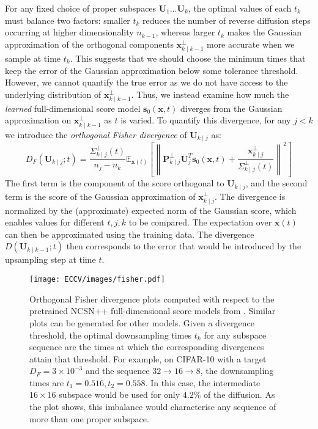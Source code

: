 \documentclass{article}
\begin{document}
For any fixed choice of proper subspaces $\mathbf{U}_1\ldots\mathbf{U}_k$, the optimal values of each $t_k$ must balance two factors: smaller $t_k$ reduces the number of reverse diffusion steps occurring at higher dimensionality $n_{k-1}$, whereas larger $t_k$ makes the Gaussian approximation of the orthogonal components $\mathbf{x}^{\perp}_{k\mid k-1}$ more accurate when we sample at time $t_k$. This suggests that we should choose the minimum times that keep the error of the Gaussian approximation below some tolerance threshold. However, we cannot quantify the true error as we do not have access to the underlying distribution of $\mathbf{x}^\perp_{k\mid k-1}$. Thus, we instead examine how much the \emph{learned} full-dimensional score model $\mathbf{s}_{0}(\mathbf{x}, t)$ diverges from the Gaussian approximation on $\mathbf{x}^\perp_{k\mid k-1}$ as $t$ is varied. To quantify this divergence, for any $j < k$ we introduce the \emph{orthogonal Fisher divergence} of $\mathbf{U}_{k\mid j}$ as:
\begin{equation}\label{eq:fisher}
    D_F(\mathbf{U}_{k\mid j}; t) = \frac{\Sigma^\perp_{k\mid j}(t)}{n_{j} - n_{k}}\mathbb{E}_{\mathbf{x}(t)}\left[\left\lVert \mathbf{P}^\perp_{k\mid j}\mathbf{U}_{j}^T\mathbf{s}_{0}(\mathbf{x}, t) + \frac{\mathbf{x}_{k\mid j}^\perp}{\Sigma^\perp_{k\mid j}(t)} \right\rVert^2 \right]
\end{equation}
The first term is the component of the score orthogonal to $\mathbf{U}_{k\mid j}$, and the second term is the score of the Gaussian approximation of $\mathbf{x}^\perp_{k\mid j}$. The divergence is normalized by the (approximate) expected norm of the Gaussian score, which enables values for different $t, j, k$ to be compared. The expectation over $\mathbf{x}(t)$ can then be approximated using the training data. The divergence $D(\mathbf{U}_{k\mid k-1}; t)$ then corresponds to the error that would be introduced by the upsampling step at time $t$.

\begin{figure}[t!]
    \centering
    \texttt{[image: ECCV/images/fisher.pdf]}
    \caption{Orthogonal Fisher divergence plots computed with respect to the pretrained NCSN++ full-dimensional score models from \cite{song2021score}. Similar plots can be generated for other models. Given a divergence threshold, the optimal downsampling times $t_k$ for any subspace sequence are the times at which the corresponding divergences attain that threshold. For example, on CIFAR-10 with a target $D_F = 3\times 10^{-3}$ and the sequence $32 \rightarrow 16 \rightarrow 8$, the downsampling times are $t_1=0.516, t_2=0.558$. In this case, the intermediate $16\times 16$ subspace would be used for only $4.2\%$ of the diffusion. As the plot shows, this imbalance would characterise any sequence of more than one proper subspace.}
    \label{fig:fisher}
\end{figure}
\end{document}
